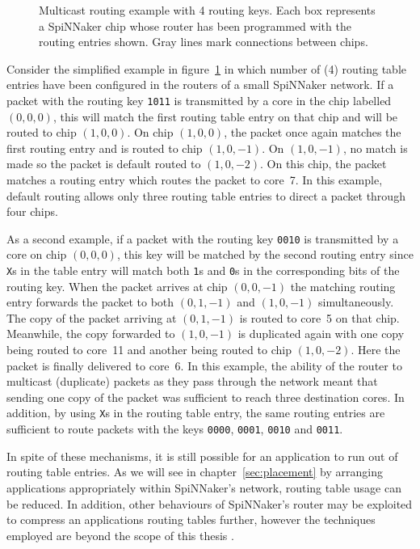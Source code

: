 			\begin{figure}
				\center
				
				\caption{Multicast routing example with \SI{4}{\bit} routing keys. Each
				box represents a SpiNNaker chip whose router has been programmed with
				the routing entries shown. Gray lines mark connections between chips.}
				\label{fig:routing-example}
			\end{figure}
			
			Consider the simplified example in figure~\ref{fig:routing-example} in
			which number of (\SI{4}{\bit}) routing table entries have been configured
			in the routers of a small SpiNNaker network. If a packet with the routing
			key \texttt{1011} is transmitted by a core in the chip labelled $(0, 0,
			0)$, this will match the first routing table entry on that chip and will
			be routed to chip $(1, 0, 0)$. On chip $(1, 0, 0)$, the packet once again
			matches the first routing entry and is routed to chip $(1, 0, -1)$. On
			$(1, 0, -1)$, no match is made so the packet is default routed to $(1, 0,
			-2)$. On this chip, the packet matches a routing entry which routes the
			packet to core~7. In this example, default routing allows only three
			routing table entries to direct a packet through four chips.
			
			As a second example, if a packet with the routing key \texttt{0010} is
			transmitted by a core on chip $(0, 0, 0)$, this key will be matched by
			the second routing entry since \texttt{X}s in the table entry will match
			both \texttt{1}s and \texttt{0}s in the corresponding bits of the routing
			key. When the packet arrives at chip $(0, 0, -1)$ the matching routing
			entry forwards the packet to both $(0, 1, -1)$ and $(1, 0, -1)$
			simultaneously. The copy of the packet arriving at $(0, 1, -1)$ is routed
			to core~5 on that chip.  Meanwhile, the copy forwarded to $(1, 0, -1)$ is
			duplicated again with one copy being routed to core~11 and another being
			routed to chip $(1, 0, -2)$. Here the packet is finally delivered to
			core~6. In this example, the ability of the router to multicast
			(duplicate) packets as they pass through the network meant that sending
			one copy of the packet was sufficient to reach three destination cores.
			In addition, by using \texttt{X}s in the routing table entry, the same
			routing entries are sufficient to route packets with the keys
			\texttt{0000}, \texttt{0001}, \texttt{0010} and \texttt{0011}.
			
			In spite of these mechanisms, it is still possible for an application to
			run out of routing table entries. As we will see in
			chapter~\ref{sec:placement} by arranging applications appropriately
			within SpiNNaker's network, routing table usage can be reduced. In
			addition, other behaviours of SpiNNaker's router may be exploited to
			compress an applications routing tables further, however the techniques
			employed are beyond the scope of this thesis \cite{mundy16}.
		
